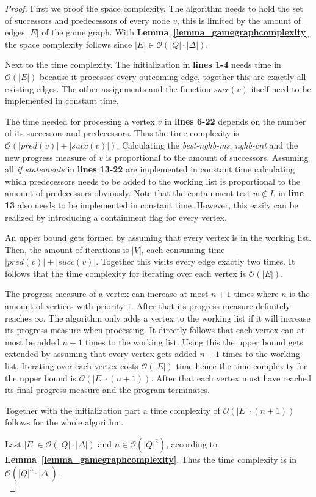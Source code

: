 \documentclass[12pt,oneside,bibliography=totoc,abstracton]{scrartcl}
\newcommand{\lemmaref}[1]{\textbf{Lemma~\ref{#1}}}
\begin{document}
\begin{proof}
	First we proof the space complexity. The algorithm needs to hold the set of successors and
	predecessors of every node $v$, this is limited by the amount of edges $|E|$ of the game graph.
	With \lemmaref{lemma_gamegraphcomplexity} the space complexity follows
	since $|E| \in \mathcal{O}(|Q| \cdot |\Delta|)$.
	
	Next to the time complexity. The initialization in \textbf{lines 1-4} needs time in $\mathcal{O}(|E|)$
	because it processes every outcoming edge, together this are exactly all existing edges.
	The other assignments and the function \textit{succ}$(v)$ itself need to be
	implemented in constant time.
	
	The time needed for processing a vertex $v$ in \textbf{lines 6-22} depends on the number of
	its successors and predecessors. Thus the time complexity is $\mathcal{O}(|pred(v)| + |succ(v)|)$.
	Calculating the \textit{best-nghb-ms}, \textit{nghb-cnt} and the new progress measure of $v$ is
	proportional to the amount of successors. Assuming all \textit{if statements} in \textbf{lines 13-22}
	are implemented in constant time calculating which predecessors needs to be added
	to the working list is proportional to the amount of predecessors obviously.
	Note that the containment test $w \notin L$ in \textbf{line 13} also needs to be implemented
	in constant time. However, this easily can be realized by introducing a
	containment flag for every vertex.
	
	An upper bound gets formed by assuming that every vertex is in the working list. Then,
	the amount of iterations is $|V|$, each consuming time $|pred(v)| + |succ(v)|$.
	Together this visits every edge exactly two times. It follows that the
	time complexity for iterating over each vertex is $\mathcal{O}(|E|)$.
	
	The progress measure of a vertex can increase at most $n + 1$ times
	where $n$ is the amount of vertices with priority $1$. After that its progress measure
	definitely reaches $\infty$. The algorithm only adds a vertex to the working list if it
	will increase its progress measure when processing. It directly follows that each vertex
	can at most be added $n + 1$ times to the working list.
	Using this the upper bound gets extended by assuming that every vertex gets
	added $n + 1$ times to the working list. Iterating over each vertex
	costs $\mathcal{O}(|E|)$ time hence the time complexity for the upper bound
	is $\mathcal{O}(|E| \cdot (n + 1))$. After that each vertex must have reached its
	final progress measure and the program terminates.
	
	Together with the initialization part a time complexity of
	$\mathcal{O}(|E| \cdot (n + 1))$ follows for the whole algorithm.
	
	Last $|E| \in \mathcal{O}(|Q| \cdot |\Delta|)$ and $n \in \mathcal{O}(|Q|^2)$,
	according to \lemmaref{lemma_gamegraphcomplexity}.
	Thus the time complexity is in $\mathcal{O}(|Q|^3 \cdot |\Delta|)$.\\
\end{proof}
\end{document}
